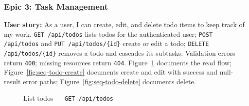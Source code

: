 \newpage

\subsubsection{Epic 3: Task Management}
\textbf{User story:} As a user, I can create, edit, and delete todo items to keep track of my work.
\newline
\texttt{GET /api/todos} lists todos for the authenticated user; \texttt{POST /api/todos} and
\texttt{PUT /api/todos/\{id\}} create or edit a todo; \texttt{DELETE /api/todos/\{id\}} removes a
todo and cascades its subtasks. Validation errors return \texttt{400}; missing resources return
\texttt{404}.
Figure~\ref{fig:seq-todo-list} documents the read flow; Figure~\ref{fig:seq-todo-create} documents
create and edit with success and null-result error paths; Figure~\ref{fig:seq-todo-delete} documents
delete.

\begin{figure}[htbp]
  \centering
  \caption{List todos --- \texttt{GET /api/todos}}
  \label{fig:seq-todo-list}
\end{figure}


